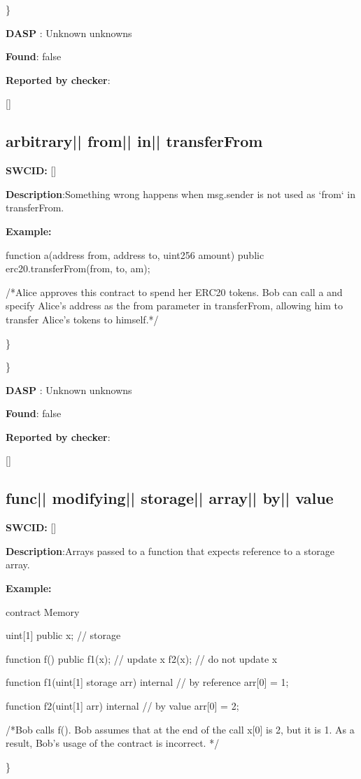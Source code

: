 \documentclass{article}
\begin{document}
\} 

\textbf{DASP} : Unknown unknowns

\textbf{Found}: false

\textbf{Reported by checker}: 
\begin{ffcode} 

[]
\end{ffcode} 
\subsection{arbitrary{|\textunderscore| }from{|\textunderscore| }in{|\textunderscore| }transferFrom} 
\textbf{SWC{\textunderscore }ID:} []

\textbf{Description}:Something wrong happens when msg.sender is not used as `from` in transferFrom.


\textbf{Example:} 
\begin{ffcode} 

function a(address from, address to, uint256 amount) public {
  erc20.transferFrom(from, to, am);
}

 /*Alice approves this contract to spend her ERC20 tokens. Bob can call a and specify Alice's address as the from parameter in transferFrom, allowing him to transfer Alice's tokens to himself.*/ 

\end{ffcode} 
\} 

\} 

\textbf{DASP} : Unknown unknowns

\textbf{Found}: false

\textbf{Reported by checker}: 
\begin{ffcode} 

[]
\end{ffcode} 
\subsection{func{|\textunderscore| }modifying{|\textunderscore| }storage{|\textunderscore| }array{|\textunderscore| }by{|\textunderscore| }value} 
\textbf{SWC{\textunderscore }ID:} []

\textbf{Description}:Arrays passed to a function that expects reference to a storage array.


\textbf{Example:} 
\begin{ffcode} 

contract Memory {
    uint[1] public x; // storage

    function f() public {
        f1(x); // update x
        f2(x); // do not update x
    }

    function f1(uint[1] storage arr) internal { // by reference
        arr[0] = 1;
    }

    function f2(uint[1] arr) internal { // by value
        arr[0] = 2;
    }
}

 /*Bob calls f(). Bob assumes that at the end of the call x[0] is 2, but it is 1. As a result, Bob's usage of the contract is incorrect. */ 

\end{ffcode} 
\} 
\end{document}
